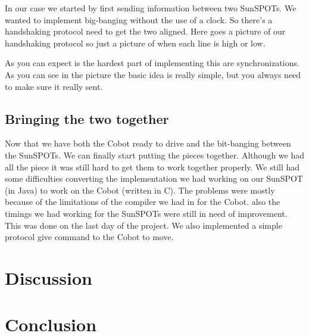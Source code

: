 \documentclass[a4paper,12pt]{article}
\begin{document}
In our case we started by first sending information between two SunSPOTs. We
wanted to implement big-banging without the use of a clock. So there's a
handshaking protocol need to get the two aligned. Here goes a picture of our
handshaking protocol so just a picture of when each line is high or low.

As you can expect is the hardest part of implementing this are synchronizations.
As you can see in the picture the basic idea is really simple, but you always
need to make sure it really sent.


\subsection{Bringing the two together}
\label{subsec:together}

Now that we have both the Cobot ready to drive and the bit-banging between the
SunSPOTs. We can finally start putting the pieces together. Although we had all
the piece it was still hard to get them to work together properly. We still had
some difficulties converting the implementation we had working on our SunSPOT
(in Java) to work on the Cobot (written in C). The problems were mostly because
of the limitations of the compiler we had in for the Cobot. also the timings we
had working for the SunSPOTs were still in need of improvement. This was done on
the last day of the project. We also implemented a simple protocol give command
to the Cobot to move.

\section{Discussion}

\section{Conclusion}
\end{document}

